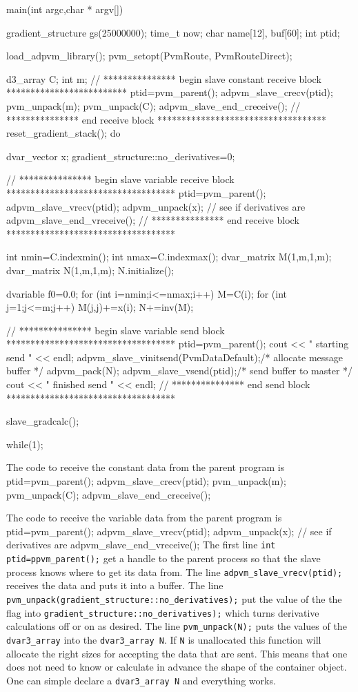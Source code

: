 main(int argc,char * argv[])
{
  gradient_structure gs(25000000);
  time_t now;
  char name[12], buf[60];
  int ptid;

  load_adpvm_library();
  pvm_setopt(PvmRoute, PvmRouteDirect);
  
  d3_array C;
  int m;
  // ***************  begin slave constant receive block *************************
   ptid=pvm_parent();
   adpvm_slave_crecv(ptid);
   pvm_unpack(m);  
   pvm_unpack(C); 
   adpvm_slave_end_creceive();
  // ***************  end receive block ***********************************
  reset_gradient_stack();
  do
  {
    dvar_vector x;
    gradient_structure::no_derivatives=0;

    // ***************  begin slave variable receive block ***********************************
     ptid=pvm_parent();
     adpvm_slave_vrecv(ptid);
     adpvm_unpack(x);  // see if derivatives are
     adpvm_slave_end_vreceive();
    // ***************  end receive block ***********************************
  
     int nmin=C.indexmin();
     int nmax=C.indexmax();
     dvar_matrix M(1,m,1,m);
     dvar_matrix N(1,m,1,m);
     N.initialize();

     dvariable f0=0.0;
     for (int i=nmin;i<=nmax;i++)
     {
       M=C(i);
       for (int j=1;j<=m;j++)
       {
         M(j,j)+=x(i);
       }
       N+=inv(M);
     }
  
    // ***************  begin slave variable send block ***********************************
    ptid=pvm_parent();
    cout << " starting send " << endl;
    adpvm_slave_vinitsend(PvmDataDefault);/* allocate message buffer */	
    adpvm_pack(N);
    adpvm_slave_vsend(ptid);/* send buffer to master */
    cout << " finished send " << endl;
    // ***************  end send block ***********************************

    slave_gradcalc();
  }
  while(1);
}
\endexample

The code to receive the constant data from the parent program is
\beginexample
   ptid=pvm_parent();
   adpvm_slave_crecv(ptid);
   pvm_unpack(m);  
   pvm_unpack(C); 
   adpvm_slave_end_creceive();
\endexample

The code to receive the variable data from the parent program is
\beginexample
   ptid=pvm_parent();
   adpvm_slave_vrecv(ptid);
   adpvm_unpack(x);  // see if derivatives are
   adpvm_slave_end_vreceive();
\endexample
The first line {\tt int ptid=ppvm\_parent();} get a handle to the parent process
so that the slave process knows where to get its data from. The line
     { \tt adpvm\_slave\_vrecv(ptid);} receives the data and puts it into a buffer.
The line
    {\tt  pvm\_unpack(gradient\_structure::no\_derivatives);} put the value of the 
the flag into {\tt  gradient\_structure::no\_derivatives);} which turns
derivative calculations off or on as desired. 
The line {\tt  pvm\_unpack(N);}
puts the values of the {\tt dvar3\_array} into the {\tt dvar3\_array N}.
If {\tt N} is unallocated this function will allocate the right sizes for 
accepting the data that are sent. This means that one does not need to
know or calculate in advance the shape of the container object. One can simple
declare a {\tt dvar3\_array N} and everything works.

